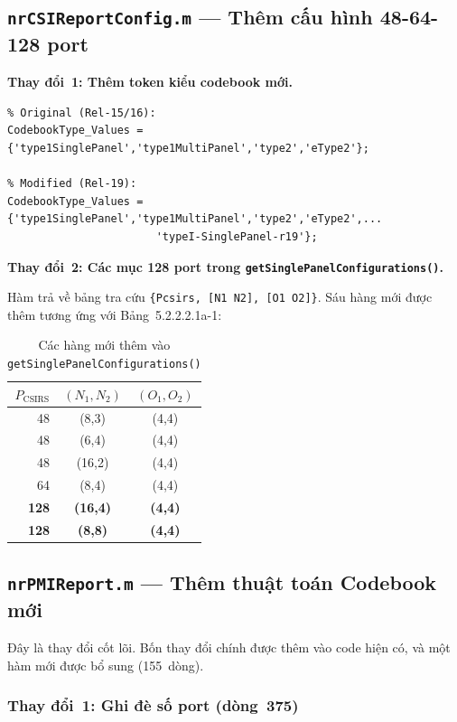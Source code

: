 \documentclass[11pt,a4paper]{article}
\begin{document}
\subsection{\texttt{nrCSIReportConfig.m} --- Thêm cấu hình 48-64-128 port}

\textbf{Thay đổi~1: Thêm token kiểu codebook mới.}

\begin{lstlisting}
% Original (Rel-15/16):
CodebookType_Values = {'type1SinglePanel','type1MultiPanel','type2','eType2'};

% Modified (Rel-19):
CodebookType_Values = {'type1SinglePanel','type1MultiPanel','type2','eType2',...
                       'typeI-SinglePanel-r19'};
\end{lstlisting}

\textbf{Thay đổi~2: Các mục 128 port trong \texttt{getSinglePanelConfigurations()}.}

Hàm trả về bảng tra cứu \texttt{\{Pcsirs, [N1 N2], [O1 O2]\}}.
Sáu hàng mới được thêm tương ứng với Bảng~5.2.2.2.1a-1:

\begin{table}[htbp]
\centering
\caption{Các hàng mới thêm vào \texttt{getSinglePanelConfigurations()}}
\begin{tabular}{rcc}
\toprule
$P_\text{CSIRS}$ & $(N_1,N_2)$ & $(O_1,O_2)$ \\
\midrule
48 & (8,3) & (4,4) \\
48 & (6,4) & (4,4) \\
48 & (16,2) & (4,4) \\
64 & (8,4) & (4,4) \\
\textbf{128} & \textbf{(16,4)} & \textbf{(4,4)} \\
\textbf{128} & \textbf{(8,8)} & \textbf{(4,4)} \\
\bottomrule
\end{tabular}
\end{table}

\subsection{\texttt{nrPMIReport.m} --- Thêm thuật toán Codebook mới}

Đây là thay đổi cốt lõi. Bốn thay đổi chính được thêm vào code hiện có,
và một hàm mới được bổ sung (155~dòng).

\subsubsection{Thay đổi~1: Ghi đè số port (dòng~375)}
\end{document}

